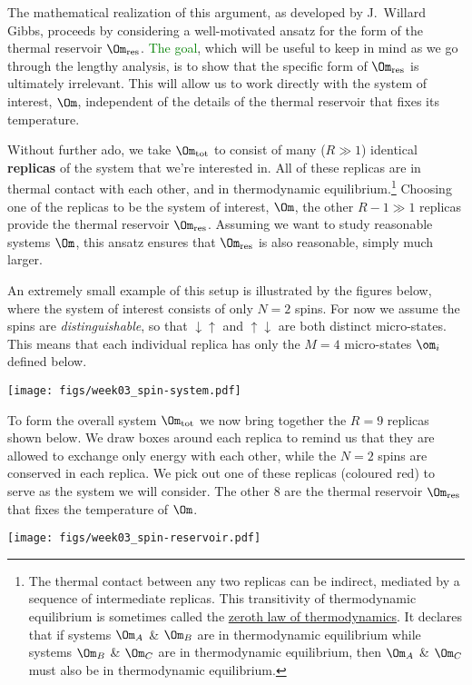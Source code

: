The mathematical realization of this argument, as developed by J.\ Willard Gibbs, proceeds by considering a well-motivated ansatz for the form of the thermal reservoir $\Om_{\text{res}}$.
\textcolor{green}{The goal}, which will be useful to keep in mind as we go through the lengthy analysis, is to show that the specific form of $\Om_{\text{res}}$ is ultimately irrelevant.
This will allow us to work directly with the system of interest, $\Om$, independent of the details of the thermal reservoir that fixes its temperature.

Without further ado, we take $\Om_{\text{tot}}$ to consist of many ($R \gg 1$) identical \textbf{replicas} of the system \Om that we're interested in.
All of these replicas are in thermal contact with each other, and in thermodynamic equilibrium.\footnote{The thermal contact between any two replicas can be indirect, mediated by a sequence of intermediate replicas.  This transitivity of thermodynamic equilibrium is sometimes called the \href{https://en.wikipedia.org/wiki/Zeroth_law_of_thermodynamics}{zeroth law of thermodynamics}.  It declares that if systems $\Om_A$ \& $\Om_B$ are in thermodynamic equilibrium while systems $\Om_B$ \& $\Om_C$ are in thermodynamic equilibrium, then $\Om_A$ \& $\Om_C$ must also be in thermodynamic equilibrium.}
Choosing one of the replicas to be the system of interest, $\Om$, the other $R - 1 \gg 1$ replicas provide the thermal reservoir $\Om_{\text{res}}$.
Assuming we want to study reasonable systems $\Om$, this ansatz ensures that $\Om_{\text{res}}$ is also reasonable, simply much larger.

An extremely small example of this setup is illustrated by the figures below, where the system of interest consists of only $N = 2$ spins.
For now we assume the spins are \textit{distinguishable}, so that $\downarrow\uparrow$ and $\uparrow\downarrow$ are both distinct micro-states.
This means that each individual replica has only the $M = 4$ micro-states $\om_i$ defined below.
\begin{center}
  \texttt{[image: figs/week03\_spin-system.pdf]}
\end{center}
To form the overall system $\Om_{\text{tot}}$ we now bring together the $R = 9$ replicas shown below.
We draw boxes around each replica to remind us that they are allowed to exchange only energy with each other, while the $N = 2$ spins are conserved in each replica.
We pick out one of these replicas (coloured red) to serve as the system \Om we will consider.
The other $8$ are the thermal reservoir $\Om_{\text{res}}$ that fixes the temperature of $\Om$.
\begin{center}
  \texttt{[image: figs/week03\_spin-reservoir.pdf]}
\end{center}

